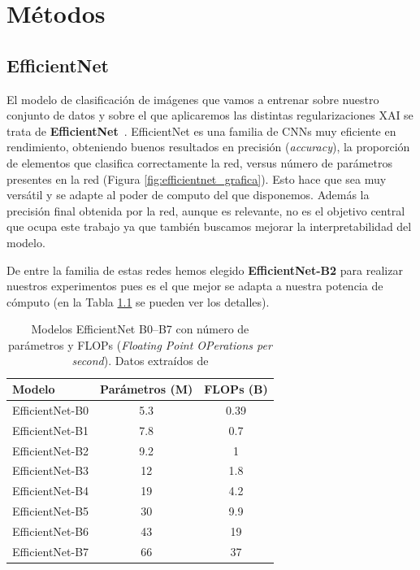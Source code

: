 \newpage
\chapter{Métodos} \label{cap:met}

\section{EfficientNet}

El modelo de clasificación de imágenes que vamos a entrenar sobre nuestro conjunto de datos y sobre el que aplicaremos las distintas regularizaciones XAI se trata de \textbf{EfficientNet}~\cite{efficientnet2019}. EfficientNet es una familia de CNNs muy eficiente en rendimiento, obteniendo buenos resultados en precisión (\textit{accuracy}), la proporción de elementos que clasifica correctamente la red, versus número de parámetros presentes en la red (Figura \ref{fig:efficientnet_grafica}). Esto hace que sea muy versátil y se adapte al poder de computo del que disponemos. Además la precisión final obtenida por la red, aunque es relevante, no es el objetivo central que ocupa este trabajo ya que también buscamos mejorar la interpretabilidad del modelo.

De entre la familia de estas redes hemos elegido \textbf{EfficientNet-B2} para realizar nuestros experimentos pues es el que mejor se adapta a nuestra potencia de cómputo (en la Tabla \ref{tab:EfficientNet_Params} se pueden ver los detalles).

\begin{table}[h!]
\centering
\begin{tabular}{lcc}
\hline
\textbf{Modelo} & \textbf{Parámetros (M)} & \textbf{FLOPs (B)} \\
\hline
EfficientNet-B0 & 5.3  & 0.39 \\
EfficientNet-B1 & 7.8  & 0.7 \\
EfficientNet-B2 & 9.2  & 1 \\
EfficientNet-B3 & 12   & 1.8 \\
EfficientNet-B4 & 19   & 4.2 \\
EfficientNet-B5 & 30   & 9.9 \\
EfficientNet-B6 & 43   & 19 \\
EfficientNet-B7 & 66   & 37 \\
\hline
\end{tabular}
\caption{Modelos EfficientNet B0--B7 con número de parámetros y FLOPs (\textit{Floating Point OPerations per second}). Datos extraídos de \protect\cite{efficientnet2019}}
\label{tab:EfficientNet_Params}
\end{table}

